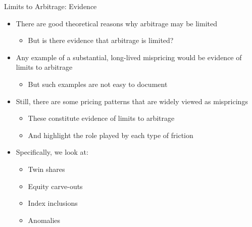 \documentclass[aspectratio=169, 11pt]{beamer}
\begin{document}
\begin{frame}[shrink=5]{Limits to Arbitrage: Evidence}
\begin{itemize}
\item There are good theoretical reasons why arbitrage may be limited
  \begin{itemize}
  \item But is there evidence that arbitrage is limited?
  \end{itemize}
\item Any example of a substantial, long-lived mispricing would be evidence of limits to arbitrage
  \begin{itemize}
  \item But such examples are not easy to document
  \end{itemize}
\item Still, there are some pricing patterns that are widely viewed as mispricings
  \begin{itemize}
  \item These constitute evidence of limits to arbitrage
  \item And highlight the role played by each type of friction
  \end{itemize}
\item Specifically, we look at:
  \begin{itemize}
  \item Twin shares
  \item Equity carve-outs
  \item Index inclusions
  \item Anomalies
  \end{itemize}
\end{itemize}
\end{frame}
\end{document}
